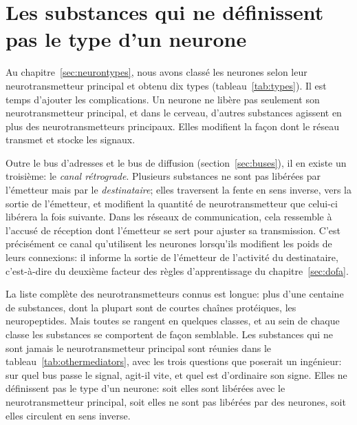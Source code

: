 \chapter{Les substances qui ne définissent pas le type d'un neurone}
\label{sec:othermediators}

Au chapitre~\ref{sec:neurontypes}, nous avons classé les neurones selon leur neurotransmetteur principal et obtenu dix types (tableau~\ref{tab:types}). Il est temps d'ajouter les complications. Un neurone ne libère pas seulement son neurotransmetteur principal, et dans le cerveau, d'autres substances agissent en plus des neurotransmetteurs principaux. Elles modifient la façon dont le réseau transmet et stocke les signaux.

Outre le bus d'adresses et le bus de diffusion (section~\ref{sec:buses}), il en existe un troisième: le \emph{canal rétrograde}. Plusieurs substances ne sont pas libérées par l'émetteur mais par le \emph{destinataire}; elles traversent la fente en sens inverse, vers la sortie de l'émetteur, et modifient la quantité de neurotransmetteur que celui-ci libérera la fois suivante. Dans les réseaux de communication, cela ressemble à l'accusé de réception dont l'émetteur se sert pour ajuster sa transmission. C'est précisément ce canal qu'utilisent les neurones lorsqu'ils modifient les poids de leurs connexions: il informe la sortie de l'émetteur de l'activité du destinataire, c'est-à-dire du deuxième facteur des règles d'apprentissage du chapitre~\ref{sec:dofa}.

La liste complète des neurotransmetteurs connus est longue: plus d'une centaine de substances, dont la plupart sont de courtes chaînes protéiques, les neuropeptides. Mais toutes se rangent en quelques classes, et au sein de chaque classe les substances se comportent de façon semblable. Les substances qui ne sont jamais le neurotransmetteur principal sont réunies dans le tableau~\ref{tab:othermediators}, avec les trois questions que poserait un ingénieur: sur quel bus passe le signal, agit-il vite, et quel est d'ordinaire son signe. Elles ne définissent pas le type d'un neurone: soit elles sont libérées avec le neurotransmetteur principal, soit elles ne sont pas libérées par des neurones, soit elles circulent en sens inverse.

